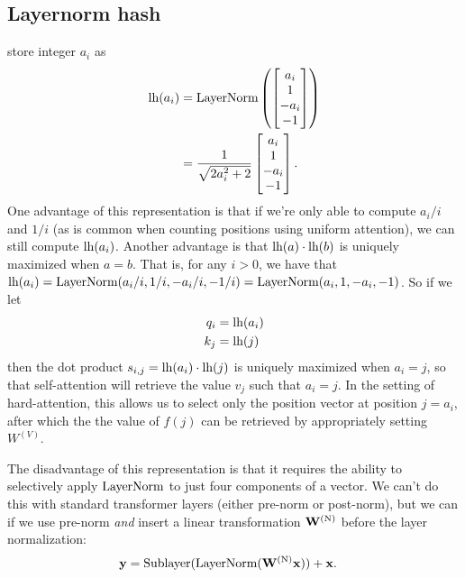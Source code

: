 \subsection{Layernorm hash}

 store integer $a_i$ as
\begin{align*}
  \textnormal{lh}(a_i) &= \textnormal{LayerNorm}\left(\begin{bmatrix} a_i \\ 1 \\ -a_i \\ -1 \end{bmatrix}\right) \\
  &= \frac1{\sqrt{2a_i^2+2}} \begin{bmatrix} a_i \\ 1 \\ -a_i \\ -1 \end{bmatrix}.
\end{align*}
One advantage of this representation is that if we're only able to compute $a_i/i$ and $1/i$ (as is common when counting positions using uniform attention), we can still compute $\textnormal{lh}(a_i)$. Another advantage is that $\textnormal{lh}(a)\cdot\textnormal{lh}(b)$ is uniquely maximized when $a=b$. That is, for any $i>0$, we have that $\textnormal{lh}(a_i)=\textnormal{LayerNorm}(a_i/i,1/i,-a_i/i,-1/i) = \textnormal{LayerNorm}(a_i,1,-a_i,-1)$. So if we let
\begin{align*}
  q_i &= \textnormal{lh}(a_i) \\
  k_j &= \textnormal{lh}(j)
\end{align*}
then the dot product $s_{i,j} = \textnormal{lh}(a_i) \cdot \textnormal{lh}(j)$ is uniquely maximized when $a_i = j$, so that self-attention will retrieve the value $v_j$ such that $a_i = j$. In the setting of hard-attention, this allows us to select only the position vector at position $j=a_i$, after which the the value of $f(j)$ can be retrieved by appropriately setting $W^{(V)}$.

The disadvantage of this representation is that it requires the ability to selectively apply $\textnormal{LayerNorm}$ to just four components of a vector. We can't do this with standard transformer layers (either pre-norm or post-norm), but we can if we use pre-norm \emph{and} insert a linear transformation $\mathbf{W}^{(\textnormal{N})}$ before the layer normalization:
\begin{align*}
  \mathbf{y} &= \textnormal{Sublayer}(\textnormal{LayerNorm}(\mathbf{W}^{(\textnormal{N})} \mathbf{x})) + \mathbf{x}.
\end{align*}

